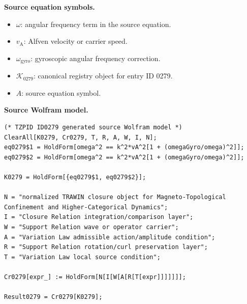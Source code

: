 \begin{minipage}[t]{0.49\linewidth}
\begingroup
\small
\raggedright
\textbf{Source equation symbols.}\par
\begin{itemize}[leftmargin=1.35em,itemsep=1pt,topsep=1pt,parsep=0pt]
    \item $\omega$: angular frequency term in the source equation.
    \item $v_{\mathrm{A}}$: Alfven velocity or carrier speed.
    \item $\omega_{\mathrm{gyro}}$: gyroscopic angular frequency correction.
    \item $\mathcal{K}_{0279}$: canonical registry object for entry ID 0279.
    \item $A$: source equation symbol.
\end{itemize}
\endgroup
\end{minipage}\hfill
\begin{minipage}[t]{0.47\linewidth}
\begingroup
\scriptsize
\raggedright
\textbf{Source Wolfram model.}\par
\begin{Verbatim}[fontsize=\tiny,breaklines=true,breakanywhere=true]
(* TZPID ID0279 generated source Wolfram model *)
ClearAll[K0279, Cr0279, T, R, A, W, I, N];
eq0279$1 = HoldForm[omega^2 == k^2*vA^2[1 + (omegaGyro/omega)^2]];
eq0279$2 = HoldForm[omega^2 == k^2*vA^2[1 + (omegaGyro/omega)^2]];

K0279 = HoldForm[{eq0279$1, eq0279$2}];

N = "normalized TRAWIN closure object for Magneto-Topological Confinement and Higher-Categorical Dynamics";
I = "Closure Relation integration/comparison layer";
W = "Support Relation wave or operator carrier";
A = "Variation Law admissible action/amplitude condition";
R = "Support Relation rotation/curl preservation layer";
T = "Variation Law local source condition";

Cr0279[expr_] := HoldForm[N[I[W[A[R[T[expr]]]]]]];

Result0279 = Cr0279[K0279];
\end{Verbatim}
\endgroup
\end{minipage}

